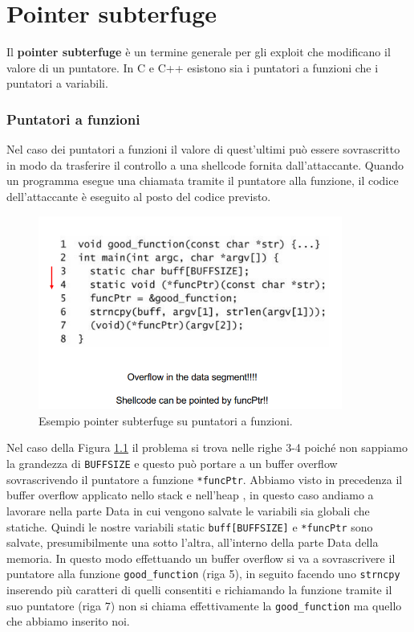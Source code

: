 \chapter{Pointer subterfuge}
Il \textbf{pointer subterfuge} è un termine generale per gli exploit che modificano il valore di un puntatore. In C e C++ esistono sia i puntatori a funzioni che i puntatori a variabili.
\subsection{Puntatori a funzioni}
Nel caso dei puntatori a funzioni il valore di quest'ultimi può essere sovrascritto in modo da trasferire il controllo a una shellcode fornita dall'attaccante. Quando un programma esegue una  chiamata tramite il puntatore alla funzione, il codice dell'attaccante è eseguito al posto del codice previsto.
\begin{figure}[H]
	\centering
	\includegraphics[width=10cm, keepaspectratio]{capitoli/secure_coding/img/cap_5/es_pointer_sub.png}
	\caption{Esempio pointer subterfuge su puntatori a funzioni.}\label{fig:es_poin_sub}
\end{figure}
Nel caso della Figura \ref{fig:es_poin_sub} il problema si trova nelle righe 3-4 poiché non sappiamo la grandezza di \verb|BUFFSIZE| e questo può portare a un buffer overflow sovrascrivendo il puntatore a funzione \verb|*funcPtr|. Abbiamo visto in precedenza il buffer overflow applicato nello stack e nell'heap , in questo caso andiamo a lavorare nella parte Data in cui vengono salvate le variabili sia globali che statiche. Quindi le nostre variabili static \verb|buff[BUFFSIZE]| e \verb|*funcPtr| sono salvate, presumibilmente una sotto l'altra, all'interno della parte Data della memoria. In questo modo effettuando un buffer overflow si va a sovrascrivere il puntatore alla funzione \verb|good_function| (riga 5), in seguito facendo uno \verb|strncpy| inserendo più caratteri di quelli consentiti e richiamando la funzione tramite il suo puntatore (riga 7) non si chiama effettivamente la \verb|good_function| ma quello che abbiamo inserito noi.
